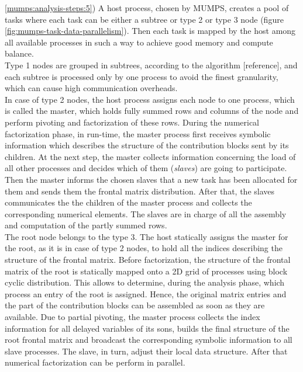 \ref{mumps:analysis-steps:5}) A host process, chosen by MUMPS, creates a pool of tasks where each task can be either a subtree or type 2 or type 3 node (figure \ref{fig:mumps-task-data-parallelism}). Then each task is mapped by the host among all available processes in such a way to achieve good memory and compute balance.\\

 
Type 1 nodes are grouped in subtrees, according to the algorithm [reference], and each subtree is processed only by one process to avoid the finest granularity, which can cause high communication overheads. \\


In case of type 2 nodes, the host process assigns each node to one process, which is called the master, which holds fully summed rows and columns of the node and perform pivoting and factorization of these rows. During the numerical factorization phase, in run-time, the master process first receives symbolic information which describes the structure of the contribution blocks sent by its children. At the next step, the master collects information concerning the load of all other processes and decides which of them (\textit{slaves}) are going to participate. Then the master informs the chosen slaves that a new task has been allocated for them and sends them the frontal matrix distribution. After that, the slaves communicates the the children of the master process and collects the corresponding numerical elements. The slaves are in charge of all the assembly and computation of the partly summed rows. \\


The root node belongs to the type 3. The host statically assigns the master for the root, as it is in case of type 2 nodes, to hold all the indices describing the structure of the frontal matrix. Before factorization, the structure of the frontal matrix of the root is statically mapped onto a 2D grid of processes using block cyclic distribution. This allows to determine, during the analysis phase, which process an entry of the root is assigned. Hence, the original matrix entries and the part of the contribution blocks can be assembled as soon as they are available. Due to partial pivoting, the master process collects the index information for all delayed variables of its sons, builds the final structure of the root frontal matrix and broadcast the corresponding symbolic information to all slave processes. The slave, in turn, adjust their local data structure. After that numerical factorization can be perform in parallel.\\


